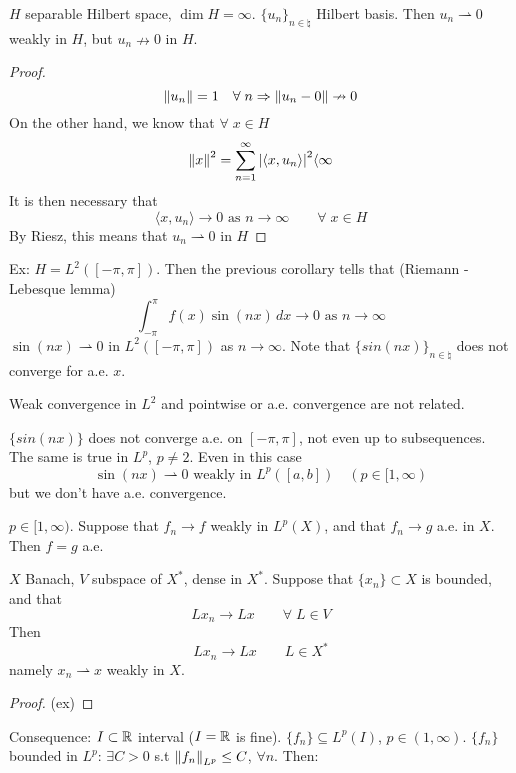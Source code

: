 \begin{corollary}
    \(H\) separable Hilbert space, \(\dim H = \infty\). \(\{u_n\}_{n \in \natural}\) Hilbert basis. Then \(u_n \rightharpoonup 0\) weakly in \(H\), but \(u_n \nrightarrow 0\) in \(H\).
\end{corollary}
\begin{proof}
    \[
        \norm{u_n}=1 \quad \forall\; n \Rightarrow \norm{u_n -0} \nrightarrow 0 
    \]
    On the other hand, we know that \(\forall \; x \in H\)
    \[
        \norm{x}^2 = \sum_{n=1}^\infty \abs{\langle x, u_n\rangle  }^2 \langle  \infty
    \]
    It is then necessary that
    \[
        \langle x, u_n\rangle   \to 0 \text{ as } n \to \infty \qquad \forall\; x \in H
    \]
    By Riesz, this means that \(u_n \rightharpoonup 0\) in \(H\)
\end{proof}

Ex: \(H = L^2([-\pi, \pi])\). Then the previous corollary tells that (Riemann - Lebesque lemma)
\[
    \int_{-\pi}^\pi f(x) \sin (nx) \, dx \to 0 \text{ as } n \to \infty
\]                
\(\sin(nx) \rightharpoonup 0\) in \(L^2([-\pi, \pi])\) as \(n \to \infty\). Note that \(\{sin(nx)\}_{n \in \natural}\) does not converge for a.e. \(x\).

Weak convergence in \(L^2\) and pointwise or a.e. convergence are not related.

\(\{sin(nx)\}\) does not converge a.e. on \([-\pi, \pi]\), not even up to subsequences. 
The same is true in \(L^p\), \(p \neq 2\). Even in this case
\[
    \sin(nx) \rightharpoonup 0 \text{ weakly in } L^p([a,b]) \quad (p \in [1, \infty)
\] 
but we don't have a.e. convergence.

\begin{proposition}
    \(p \in [1, \infty)\). Suppose that \(f_n \to f\) weakly in \(L^p(X)\), and that \(f_n \to g\) a.e. in \(X\). Then \(f=g\) a.e.
\end{proposition}

\begin{proposition}
    \(X\) Banach, \(V\) subspace of \(X^*\), dense in \(X^*\). Suppose that \(\{x_n\} \subset X\) is bounded, and that 
    \[
        L x_n \to Lx \qquad \forall\; L \in V
    \]
    Then
    \[
        L x_n \to Lx \qquad L \in X^*
    \]
    namely \(x_n \rightharpoonup x\) weakly in \(X\).
\end{proposition}
\begin{proof}
    (ex)
\end{proof}

Consequence: \(I \subset \mathbb{R}\) interval (\(I= \mathbb{R}\) is fine). \(\{f_n\} \subseteq L^p(I)\), \(p \in (1, \infty)\). 
\(\{f_n\}\) bounded in \(L^p\): \(\exists C>  0\) s.t \(\norm{f_n}_{L^p} \leq C\), \(\forall n\). Then:

